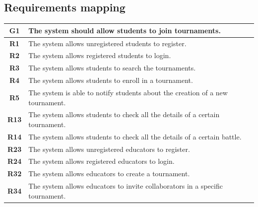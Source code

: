 \documentclass[12pt, a4paper]{report}
\newcounter{Requirements}
\begin{document}
    \subsection{Requirements mapping}
    \begin{table}[H]
        \begin{tabularx}{\textwidth}{cX}
        \textbf{G1}  & The system should allow students to join tournaments.                            \\ \hline
        \textbf{R1}  & The system allows unregistered students to register.                             \\
        \textbf{R2}  & The system allows registered students to login.                                  \\
        \textbf{R3}  & The system allows students to search the tournaments.                            \\
        \textbf{R4}  & The system allows students to enroll in a tournament.                            \\
        \textbf{R5}  & The system is able to notify students about the creation of a new tournament.    \\
        \textbf{R13} & The system allows students to check all the details of a certain tournament.     \\
        \textbf{R14} & The system allows students to check all the details of a certain battle.         \\
        \textbf{R23} & The system allows unregistered educators to register.                            \\
        \textbf{R24} & The system allows registered educators to login.                                 \\
        \textbf{R32} & The system allows educators to create a tournament.                              \\
        \textbf{R34} & The system allows educators to invite collaborators in a specific tournament.    \\
        \end{tabularx}
    \end{table}
\end{document}
